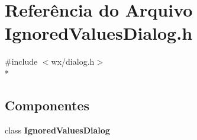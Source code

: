 \section{Referência do Arquivo Ignored\+Values\+Dialog.\+h}
\label{_ignored_values_dialog_8h}
{\ttfamily \#include $<$wx/dialog.\+h$>$}\\*
\subsection*{Componentes}
\begin{DoxyCompactItemize}
\item 
class {\bf Ignored\+Values\+Dialog}
\end{DoxyCompactItemize}
